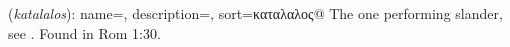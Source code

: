 \item[Slanderer,]

(\textit{katalalos}):
{
    name=,
    description={},
    sort=καταλαλος@
}
The one performing slander, see .
Found in Rom 1:30.
